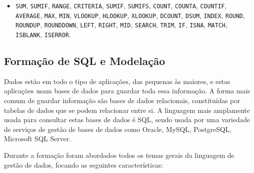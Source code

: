       \begin{itemize}
          \item \texttt{SUM}, \texttt{SUMIF}, \texttt{RANGE}, \texttt{CRITERIA}, \texttt{SUMIF}, \texttt{SUMIFS}, \texttt{COUNT}, \texttt{COUNTA}, \texttt{COUNTIF}, \texttt{AVERAGE}, \texttt{MAX}, \texttt{MIN}, \texttt{VLOOKUP}, \texttt{HLOOKUP}, \texttt{XLOOKUP}, \texttt{DCOUNT}, \texttt{DSUM}, \texttt{INDEX}, \texttt{ROUND}, \texttt{ROUNDUP}, \texttt{ROUNDDOWN}, \texttt{LEFT}, \texttt{RIGHT}, \texttt{MID}, \texttt{SEARCH}, \texttt{TRIM}, \texttt{IF}, \texttt{ISNA}, \texttt{MATCH}, \texttt{ISBLANK}, \texttt{ISERROR}.
      \end{itemize}    
    
    \subsection{Formação de SQL e Modelação}\label{subsec:sqlmodelacao}

      Dados estão em todo o tipo de aplicações, das pequenas às maiores, e estas aplicações usam bases de dados para guardar toda essa informação. A forma mais comum de guardar informação são bases de dados relacionais, constituídas por tabelas de dados que se podem relacionar entre si\cite{welcome-to-sql}. A linguagem mais amplamente usada para consultar estas bases de dados é SQL, sendo usada por uma variedade de serviços de gestão de bases de dados como Oracle, MySQL, PostgreSQL, Microsoft SQL Server\cite{sql-vs-mysql}.

      Durante a formação foram abordados todos os temas gerais da linguagem de gestão de dados, focando as seguintes características:

